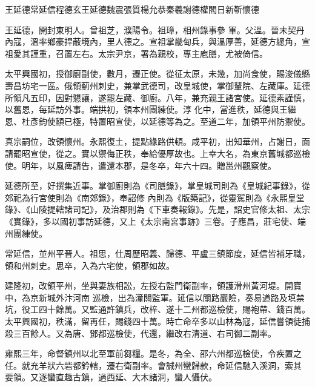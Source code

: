 
\begin{pinyinscope}

 王延德常延信程德玄王延德魏震張質楊允恭秦羲謝德權閻日新靳懷德



 王延德，開封東明人。曾祖芝，濮陽令。祖璋，相州錄事參
 軍。父溫。晉末契丹內寇，溫率鄉豪捍蔽境內，里人德之。宣祖掌畿甸兵，與溫厚善，延德方總角，宣祖愛其謹重，召置左右。太宗尹京，署為親校，專主庖膳，尤被倚信。



 太平興國初，授御廚副使，數月，遷正使。從征太原，未幾，加尚食使，賜浚儀縣壽昌坊宅一區。俄領薊州刺史，兼掌武德司，改皇城使，掌御輦院、左藏庫。延德所領凡五印，因對懇讓，遂罷左藏、御廚。八年，兼充親王諸宮使。延德素謹慎，以舊恩，每延訪外事。端拱初，領本州團練使。淳
 化中，當進秩，延德與王繼恩、杜彥鈞使額已極，特置昭宣使，以延德等為之。至道二年，加領平州防禦使。



 真宗嗣位，改領懷州。永熙復土，提點緣路供頓。咸平初，出知華州，占謝日，面請罷昭宣使，從之。實以禦侮正秩，奉給優厚故也。上幸大名，為東京舊城都巡檢使。明年，以風痺請告，遣還本郡，是冬卒，年六十四。贈邕州觀察使。



 延德所至，好撰集近事。掌御廚則為《司膳錄》，掌皇城司則為《皇城紀事錄》，從郊祀為行宮使則為《南郊錄》，奉詔修
 內則為《版築記》，從靈駕則為《永熙皇堂錄》、《山陵提轄諸司記》，及治郡則為《下車奏報錄》。先是，詔史官修太祖、太宗《實錄》，多以國初事訪延德，又上《太宗南宮事跡》三卷。子應昌，莊宅使、端州團練使。



 常延信，並州平晉人。祖思，仕周歷昭義、歸德、平盧三鎮節度，延信皆補牙職，領和州刺史。思卒，入為六宅使，領郡如故。



 建隆初，改領平州，坐與妻族相訟，左授右監門衛副率，領護滑州黃河堤。開寶中，為京新城外汴河南
 巡檢，出為潼關監軍。延信以關路巖險，奏易道路及填禁坑，役工四十餘萬。又監通許鎮兵，改梓、遂十二州都巡檢使，賜袍帶、錢百萬。太平興國初，秩滿，留再任，賜錢四十萬。時亡命卒多以山林為寇，延信嘗領徒捕殺三百餘人。又為唐、鄧都巡檢使，代還，繼改右清道、右司御二副率。



 雍熙三年，命督鎮州以北至軍前芻糧。是冬，為全、邵六州都巡檢使，令疾置之任。就充羊狀六砦都鈐轄，遷右衛副率。會誠州蠻歸款，命延信馳入溪洞，索其
 要領。又逐蠻直趣古鎮，過西延、大木諸洞，蠻人懾伏。




\end{pinyinscope}

